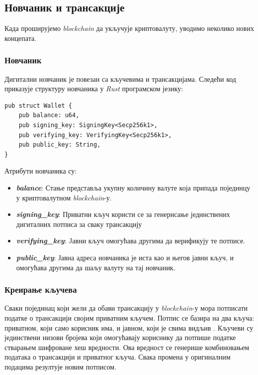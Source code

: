 \documentclass[12pt, a4paper]{article}
\begin{document}
\subsection{Новчаник и трансакције}
Када проширујемо \textit{blockchain} да укључује криптовалуту, уводимо неколико нових концепата.

\subsubsection{Новчаник}
Дигитални новчаник је повезан са кључевима и трансакцијама. Следећи код приказује структуру новчаника у \textit{Rust} програмском језику:

\begin{verbatim}
pub struct Wallet {
    pub balance: u64,
    pub signing_key: SigningKey<Secp256k1>,
    pub verifying_key: VerifyingKey<Secp256k1>,
    pub public_key: String,
}

\end{verbatim}


Атрибути новчаника су:
\begin{itemize}
    \item \textbf{\textit{balance}}: Стање представља укупну количину валуте која припада појединцу у криптовалутном \textit{blockchain}-у.
    \item \textbf{\textit{signing\_key}}: Приватни кључ користи се за генерисање јединствених дигиталних потписа за сваку трансакцију
    \item \textbf{\textit{verifying\_key}}: Jавни кључ омогућава другима да верификују те потписе.
    \item \textbf{\textit{public\_key}}: Јавна адреса новчаника је иста као и његов јавни кључ, и омогућава другима да шаљу валуту на тај новчаник.
\end{itemize}



\subsubsection{Креирање кључева}
Сваки појединац који жели да обави трансакцију у \textit{blockchain}-у мора потписати податке о трансакцији својим приватним кључем. Потпис се базира на два кључа: приватном, који само корисник има, и јавном, који је свима видљив \cite{11}. Кључеви су јединствени низови бројева који омогућавају кориснику да потпише податке стварањем шифроване хеш вредности. Ова вредност се генерише комбиновањем података о трансакцији и приватног кључа. Свака промена у оригиналним подацима резултује новим потписом.
\end{document}
